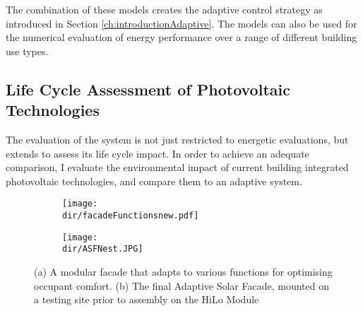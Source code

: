The combination of these models creates the adaptive control strategy as introduced in Section \ref{ch:introductionAdaptive}. The models can also be used for the numerical evaluation of energy performance over a range of different building use types.

\subsection{Life Cycle Assessment of Photovoltaic Technologies}
The evaluation of the system is not just restricted to energetic evaluations, but extends to assess its life cycle impact. In order to achieve an adequate comparison, I evaluate the environmental impact of current building integrated photovoltaic technologies, and compare them to an adaptive system. 




\begin{figure}
    \centering
    \begin{subfigure}[b]{0.8\columnwidth}
        \texttt{[image: \\dir/facadeFunctionsnew.pdf]}
		\caption{}
        \label{fig:facadefunctions}
    \end{subfigure} 
    \vspace{10mm}

    \begin{subfigure}[b]{0.8\columnwidth}
        \texttt{[image: \\dir/ASFNest.JPG]}
		\caption{}
        \label{fig:ASFNest}
    \end{subfigure}
    \hfill

    \caption{(a) A modular facade that adapts to various functions for optimising occupant comfort. (b) The final Adaptive Solar Facade, mounted on a testing site prior to assembly on the HiLo Module}
\end{figure}

